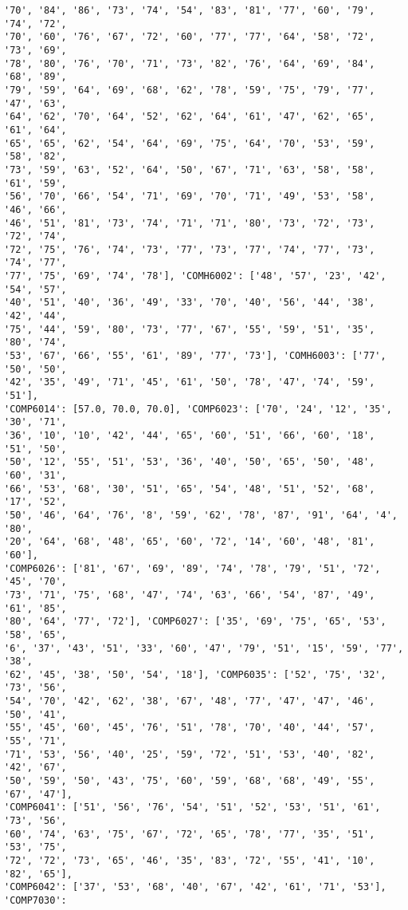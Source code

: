\documentclass[11pt]{article}
\begin{document}
\begin{Verbatim}[commandchars=\\\{\}]
'70', '84', '86', '73', '74', '54', '83', '81', '77', '60', '79', '74', '72',
'70', '60', '76', '67', '72', '60', '77', '77', '64', '58', '72', '73', '69',
'78', '80', '76', '70', '71', '73', '82', '76', '64', '69', '84', '68', '89',
'79', '59', '64', '69', '68', '62', '78', '59', '75', '79', '77', '47', '63',
'64', '62', '70', '64', '52', '62', '64', '61', '47', '62', '65', '61', '64',
'65', '65', '62', '54', '64', '69', '75', '64', '70', '53', '59', '58', '82',
'73', '59', '63', '52', '64', '50', '67', '71', '63', '58', '58', '61', '59',
'56', '70', '66', '54', '71', '69', '70', '71', '49', '53', '58', '46', '66',
'46', '51', '81', '73', '74', '71', '71', '80', '73', '72', '73', '72', '74',
'72', '75', '76', '74', '73', '77', '73', '77', '74', '77', '73', '74', '77',
'77', '75', '69', '74', '78'], 'COMH6002': ['48', '57', '23', '42', '54', '57',
'40', '51', '40', '36', '49', '33', '70', '40', '56', '44', '38', '42', '44',
'75', '44', '59', '80', '73', '77', '67', '55', '59', '51', '35', '80', '74',
'53', '67', '66', '55', '61', '89', '77', '73'], 'COMH6003': ['77', '50', '50',
'42', '35', '49', '71', '45', '61', '50', '78', '47', '74', '59', '51'],
'COMP6014': [57.0, 70.0, 70.0], 'COMP6023': ['70', '24', '12', '35', '30', '71',
'36', '10', '10', '42', '44', '65', '60', '51', '66', '60', '18', '51', '50',
'50', '12', '55', '51', '53', '36', '40', '50', '65', '50', '48', '60', '31',
'66', '53', '68', '30', '51', '65', '54', '48', '51', '52', '68', '17', '52',
'50', '46', '64', '76', '8', '59', '62', '78', '87', '91', '64', '4', '80',
'20', '64', '68', '48', '65', '60', '72', '14', '60', '48', '81', '60'],
'COMP6026': ['81', '67', '69', '89', '74', '78', '79', '51', '72', '45', '70',
'73', '71', '75', '68', '47', '74', '63', '66', '54', '87', '49', '61', '85',
'80', '64', '77', '72'], 'COMP6027': ['35', '69', '75', '65', '53', '58', '65',
'6', '37', '43', '51', '33', '60', '47', '79', '51', '15', '59', '77', '38',
'62', '45', '38', '50', '54', '18'], 'COMP6035': ['52', '75', '32', '73', '56',
'54', '70', '42', '62', '38', '67', '48', '77', '47', '47', '46', '50', '41',
'55', '45', '60', '45', '76', '51', '78', '70', '40', '44', '57', '55', '71',
'71', '53', '56', '40', '25', '59', '72', '51', '53', '40', '82', '42', '67',
'50', '59', '50', '43', '75', '60', '59', '68', '68', '49', '55', '67', '47'],
'COMP6041': ['51', '56', '76', '54', '51', '52', '53', '51', '61', '73', '56',
'60', '74', '63', '75', '67', '72', '65', '78', '77', '35', '51', '53', '75',
'72', '72', '73', '65', '46', '35', '83', '72', '55', '41', '10', '82', '65'],
'COMP6042': ['37', '53', '68', '40', '67', '42', '61', '71', '53'], 'COMP7030':

\end{Verbatim}
\end{document}

